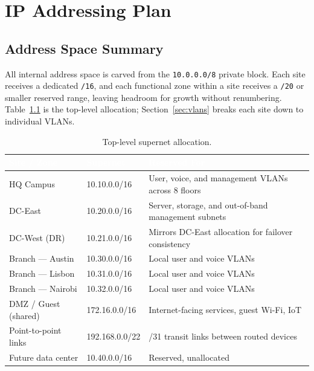 \documentclass[11pt,a4paper]{report}
\newcommand{\thd}[1]{\textcolor{white}{\textbf{#1}}}
\begin{document}
\chapter{IP Addressing Plan}

\section{Address Space Summary}
All internal address space is carved from the \texttt{10.0.0.0/8} private block. Each site
receives a dedicated \texttt{/16}, and each functional zone within a site receives a
\texttt{/20} or smaller reserved range, leaving headroom for growth without renumbering.
Table~\ref{tab:supernets} is the top-level allocation; Section~\ref{sec:vlans} breaks each
site down to individual VLANs.

\begin{table}[H]
\centering
{}
\begin{tabularx}{\linewidth}{@{}l l X@{}}
\toprule
\rowcolor{navy}
\thd{Site / Zone} & \thd{Supernet} & \thd{Reserved For} \\
\midrule
HQ Campus            & 10.10.0.0/16 & User, voice, and management VLANs across 8 floors \\
DC-East               & 10.20.0.0/16 & Server, storage, and out-of-band management subnets \\
DC-West (DR)          & 10.21.0.0/16 & Mirrors DC-East allocation for failover consistency \\
Branch --- Austin      & 10.30.0.0/16 & Local user and voice VLANs \\
Branch --- Lisbon      & 10.31.0.0/16 & Local user and voice VLANs \\
Branch --- Nairobi     & 10.32.0.0/16 & Local user and voice VLANs \\
DMZ / Guest (shared)  & 172.16.0.0/16 & Internet-facing services, guest Wi-Fi, IoT \\
Point-to-point links  & 192.168.0.0/22 & /31 transit links between routed devices \\
Future data center    & 10.40.0.0/16 & Reserved, unallocated \\
\bottomrule
\end{tabularx}
\caption{Top-level supernet allocation.}
\label{tab:supernets}
\end{table}
\end{document}
